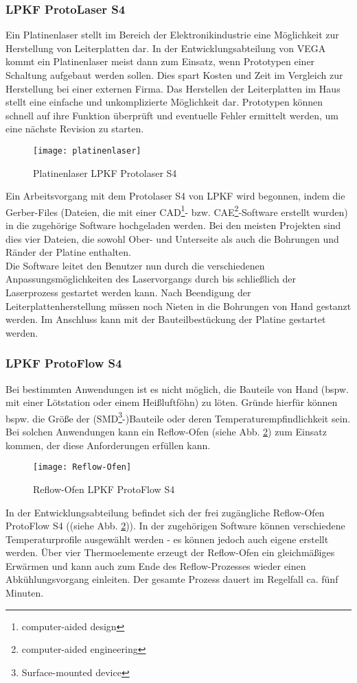 \documentclass[
	letterpaper, %
	10pt, %
]{CSUniSchoolLabReport}
\begin{document}
\begin{spacing}{1.6}
\newpage
\subsubsection{LPKF ProtoLaser S4}
Ein Platinenlaser stellt im Bereich der Elektronikindustrie eine Möglichkeit zur Herstellung von Leiterplatten dar. In der Entwicklungsabteilung von VEGA kommt ein Platinenlaser meist dann zum Einsatz, wenn Prototypen einer Schaltung aufgebaut werden sollen. Dies spart Kosten und Zeit im Vergleich zur Herstellung bei einer externen Firma. Das Herstellen der Leiterplatten im Haus stellt eine einfache und unkomplizierte Möglichkeit dar. Prototypen können schnell auf ihre Funktion überprüft und eventuelle Fehler ermittelt werden, um eine nächste Revision zu starten.
\begin{figure}[H]
    \centering
    \texttt{[image: platinenlaser]}
    \caption{Platinenlaser LPKF Protolaser S4 \cite{laser}}
    \label{fig:platinenlaser}
\end{figure}
Ein Arbeitsvorgang mit dem Protolaser S4 von LPKF wird begonnen, indem die Gerber-Files (Dateien, die mit einer CAD\footnote{computer-aided design}- bzw. CAE\footnote{computer-aided engineering}-Software erstellt wurden) in die zugehörige Software hochgeladen werden. Bei den meisten Projekten sind dies vier Dateien, die sowohl Ober- und Unterseite als auch die Bohrungen und Ränder der Platine enthalten.\\
Die Software leitet den Benutzer nun durch die verschiedenen Anpassungsmöglichkeiten des Laservorgangs durch bis schließlich der Laserprozess gestartet werden kann.
Nach Beendigung der Leiterplattenherstellung müssen noch Nieten in die Bohrungen von Hand gestanzt werden. Im Anschluss kann mit der Bauteilbestückung der Platine gestartet werden.


\subsubsection{LPKF ProtoFlow S4}
Bei bestimmten Anwendungen ist es nicht möglich, die Bauteile von Hand (bspw. mit einer Lötstation oder einem Heißluftföhn) zu löten. Gründe hierfür können bspw. die Größe der (SMD\footnote{Surface-mounted device}-)Bauteile oder deren Temperaturempfindlichkeit sein. Bei solchen Anwendungen kann ein Reflow-Ofen (siehe Abb. \ref{fig:Reflow-Ofen}) zum Einsatz kommen, der diese Anforderungen erfüllen kann.
\begin{figure}[H]
    \centering
    \texttt{[image: Reflow-Ofen]}
    \caption{Reflow-Ofen LPKF ProtoFlow S4 \cite{Ofen}}
    \label{fig:Reflow-Ofen}
\end{figure}
In der Entwicklungsabteilung befindet sich der frei zugängliche Reflow-Ofen ProtoFlow S4 ((siehe Abb. \ref{fig:Reflow-Ofen})). In der zugehörigen Software können verschiedene Temperaturprofile ausgewählt werden - es können jedoch auch eigene erstellt werden. Über vier Thermoelemente erzeugt der Reflow-Ofen ein gleichmäßiges Erwärmen und kann auch zum Ende des Reflow-Prozesses wieder einen Abkühlungsvorgang einleiten. Der gesamte Prozess dauert im Regelfall ca. fünf Minuten.


\end{spacing}
\end{document}
